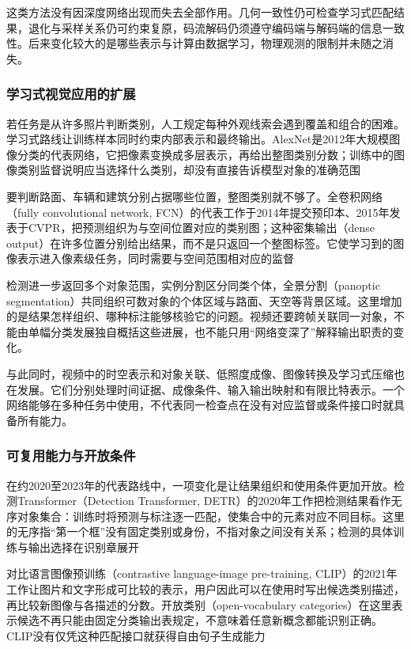 这类方法没有因深度网络出现而失去全部作用。几何一致性仍可检查学习式匹配结果，退化与采样关系仍可约束复原，码流解码仍须遵守编码端与解码端的信息一致性。后来变化较大的是哪些表示与计算由数据学习，物理观测的限制并未随之消失。

\subsubsection{学习式视觉应用的扩展}
\label{sec:vision-overview-learned-history}

若任务是从许多照片判断类别，人工规定每种外观线索会遇到覆盖和组合的困难。学习式路线让训练样本同时约束内部表示和最终输出。AlexNet是2012年大规模图像分类的代表网络，它把像素变换成多层表示，再给出整图类别分数；训练中的图像类别监督说明应当选择什么类别，却没有直接告诉模型对象的准确范围

要判断路面、车辆和建筑分别占据哪些位置，整图类别就不够了。全卷积网络（fully convolutional network, FCN）的代表工作于2014年提交预印本、2015年发表于CVPR，把预测组织为与空间位置对应的类别图；这种密集输出（dense output）在许多位置分别给出结果，而不是只返回一个整图标签。它使学习到的图像表示进入像素级任务，同时需要与空间范围相对应的监督

检测进一步返回多个对象范围，实例分割区分同类个体，全景分割（panoptic segmentation）共同组织可数对象的个体区域与路面、天空等背景区域。这里增加的是结果怎样组织、哪种标注能够核验它的问题。视频还要跨帧关联同一对象，不能由单幅分类发展独自概括这些进展，也不能只用“网络变深了”解释输出职责的变化。

与此同时，视频中的时空表示和对象关联、低照度成像、图像转换及学习式压缩也在发展。它们分别处理时间证据、成像条件、输入输出映射和有限比特表示。一个网络能够在多种任务中使用，不代表同一检查点在没有对应监督或条件接口时就具备所有能力。

\subsubsection{可复用能力与开放条件}
\label{sec:vision-overview-open-history}

在约2020至2023年的代表路线中，一项变化是让结果组织和使用条件更加开放。检测Transformer（Detection Transformer, DETR）的2020年工作把检测结果看作无序对象集合：训练时将预测与标注逐一匹配，使集合中的元素对应不同目标。这里的无序指“第一个框”没有固定类别或身份，不指对象之间没有关系；检测的具体训练与输出选择在识别章展开

对比语言图像预训练（contrastive language-image pre-training, CLIP）的2021年工作让图片和文字形成可比较的表示，用户因此可以在使用时写出候选类别描述，再比较新图像与各描述的分数。开放类别（open-vocabulary categories）在这里表示候选不再只能由固定分类输出表规定，不意味着任意新概念都能识别正确。CLIP没有仅凭这种匹配接口就获得自由句子生成能力


